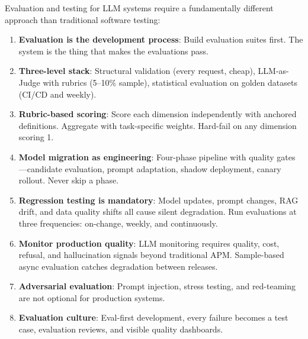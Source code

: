 Evaluation and testing for LLM systems require a fundamentally different approach than traditional software testing:

\begin{enumerate}[leftmargin=*]
    \item \textbf{Evaluation is the development process}: Build evaluation suites first. The system is the thing that makes the evaluations pass.
    \item \textbf{Three-level stack}: Structural validation (every request, cheap), LLM-as-Judge with rubrics (5--10\% sample), statistical evaluation on golden datasets (CI/CD and weekly).
    \item \textbf{Rubric-based scoring}: Score each dimension independently with anchored definitions. Aggregate with task-specific weights. Hard-fail on any dimension scoring 1.
    \item \textbf{Model migration as engineering}: Four-phase pipeline with quality gates---candidate evaluation, prompt adaptation, shadow deployment, canary rollout. Never skip a phase.
    \item \textbf{Regression testing is mandatory}: Model updates, prompt changes, RAG drift, and data quality shifts all cause silent degradation. Run evaluations at three frequencies: on-change, weekly, and continuously.
    \item \textbf{Monitor production quality}: LLM monitoring requires quality, cost, refusal, and hallucination signals beyond traditional APM. Sample-based async evaluation catches degradation between releases.
    \item \textbf{Adversarial evaluation}: Prompt injection, stress testing, and red-teaming are not optional for production systems.
    \item \textbf{Evaluation culture}: Eval-first development, every failure becomes a test case, evaluation reviews, and visible quality dashboards.
\end{enumerate}
